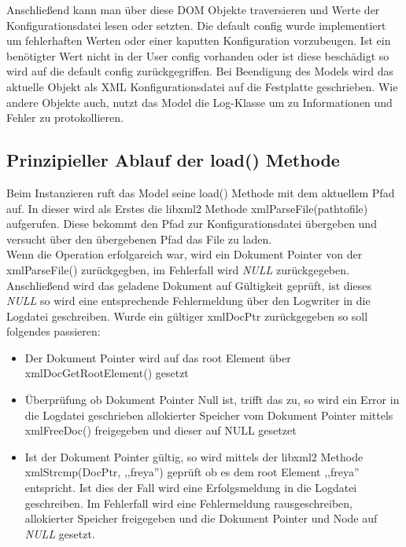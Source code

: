Anschließend kann man über diese DOM Objekte traversieren und Werte der Konfigurationsdatei lesen oder setzten.
Die default config wurde implementiert um fehlerhaften Werten oder einer kaputten Konfiguration vorzubeugen. Ist ein benötigter Wert
nicht in der User config vorhanden oder ist diese beschädigt so wird auf die default config zurückgegriffen.
Bei Beendigung des Models wird das aktuelle Objekt als XML Konfigurationsdatei auf die Festplatte geschrieben.
Wie andere Objekte auch, nutzt das Model die Log-Klasse um zu Informationen und Fehler zu protokollieren.



\subsection{Prinzipieller Ablauf der load() Methode}

Beim Instanzieren ruft das Model seine load() Methode mit dem aktuellem Pfad auf.
In dieser wird als Erstes die libxml2 Methode xmlParseFile(pathtofile) aufgerufen. Diese bekommt den
Pfad zur Konfigurationsdatei übergeben und versucht über den übergebenen Pfad das File zu laden.
\\
Wenn die Operation erfolgareich war, wird ein Dokument Pointer von der xmlParseFile() 
zurückgegben, im Fehlerfall wird \emph{NULL} zurückgegeben.
\\
Anschließend wird das geladene Dokument auf Gültigkeit geprüft, ist dieses \emph{NULL} so wird eine entsprechende Fehlermeldung über den Logwriter in die Logdatei geschreiben. Wurde ein gültiger xmlDocPtr zurückgegeben so soll folgendes passieren:

\begin{itemize}

\item Der Dokument Pointer wird auf das root Element über xmlDocGetRootElement() gesetzt
\item Überprüfung ob Dokument Pointer Null ist, trifft das zu, so wird ein Error in die Logdatei geschrieben
      allokierter Speicher vom Dokument Pointer mittels xmlFreeDoc() freigegeben und dieser auf NULL gesetzet
\item Ist der Dokument Pointer gültig, so wird mittels der libxml2 Methode xmlStrcmp(DocPtr, ,,freya'') geprüft ob es dem
      root Element ,,freya'' entspricht. Ist dies der Fall wird eine Erfolgsmeldung in die Logdatei geschreiben. Im Fehlerfall wird eine Fehlermeldung rausgeschreiben, allokierter Speicher freigegeben
und die Dokument Pointer und Node auf \emph{NULL} gesetzt. 
\end{itemize}

